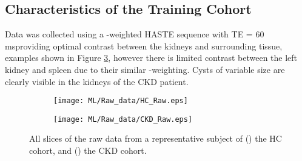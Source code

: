 \subsection{Characteristics of the Training Cohort}

Data was collected using a \ttwo-weighted \ac{HASTE} sequence with TE = 60 msproviding optimal contrast between the kidneys and surrounding tissue, examples shown in Figure \ref{fig:ml_raw}, however there is limited contrast between the left kidney and spleen due to their similar \ttwo-weighting. Cysts of variable size are clearly visible in the kidneys of the \ac{CKD} patient. 

\begin{figure}[H]
	\centering
	\begin{subfigure}[c]{0.47\textwidth}
		\centering
		\texttt{[image: ML/Raw\_data/HC\_Raw.eps]}
		\caption{}
		\label{fig:ml_raw_hc}
	\end{subfigure}
	\hfill
	\begin{subfigure}[c]{0.47\textwidth}
		\centering
		\texttt{[image: ML/Raw\_data/CKD\_Raw.eps]}
		\caption{}
		\label{fig:ml_raw_ckd}
	\end{subfigure}
	\caption{All slices of the raw data from a representative subject of () the \ac{HC} cohort, and () the \ac{CKD} cohort.}
	\label{fig:ml_raw}
\end{figure}

